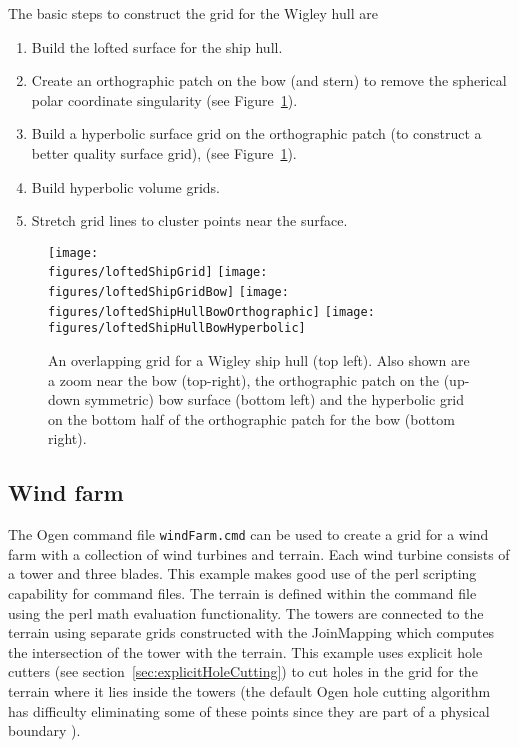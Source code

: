 \documentclass[xcolor=rgb,svgnames,dvipsnames]{article}
\newcommand{\figures}{\homeHenshaw/OvertureFigures}
\begin{document}
The basic steps to construct the grid for the Wigley hull are
\begin{enumerate}
  \item Build the lofted surface for the ship hull.
  \item Create an orthographic patch on the bow (and stern) to remove the spherical polar coordinate singularity 
          (see Figure~\ref{fig:loftedShipHullGrid}).
  \item Build a hyperbolic surface grid on the orthographic patch (to construct a better quality surface grid), 
        (see Figure~\ref{fig:loftedShipHullGrid}).
  \item Build hyperbolic volume grids.
  \item Stretch grid lines to cluster points near the surface.
\end{enumerate}


\begin{figure}[htb]
  \begin{center}
   \texttt{[image: \\figures/loftedShipGrid]}
   \texttt{[image: \\figures/loftedShipGridBow]}
   \texttt{[image: \\figures/loftedShipHullBowOrthographic]}
   \texttt{[image: \\figures/loftedShipHullBowHyperbolic]}
  \caption{An overlapping grid for a Wigley ship hull (top left). Also shown are a zoom near the bow (top-right),
        the orthographic patch on the (up-down symmetric) bow surface (bottom left) and the hyperbolic grid on the bottom half of the 
         orthographic patch for the bow (bottom right).}
    \label{fig:loftedShipHullGrid}
  \end{center}
\end{figure}


\clearpage
\subsection{Wind farm}\label{sec:windFarm}


The Ogen command file {\tt windFarm.cmd} can be used to create a grid for a wind farm with 
a collection of wind turbines and terrain. Each wind turbine consists of a tower and
three blades. This example makes good use of the perl
scripting capability for command files. The terrain is defined within the command file
using the perl math evaluation functionality. 
The towers are connected to the terrain using separate grids constructed with the JoinMapping
which computes the intersection of the tower with the terrain. This example
uses explicit hole cutters (see section~\ref{sec:explicitHoleCutting}) to cut holes
in the grid for the terrain where it lies inside the towers (the default Ogen hole cutting
algorithm has difficulty eliminating some of these points since they are part of a physical
boundary ). 
\end{document}
